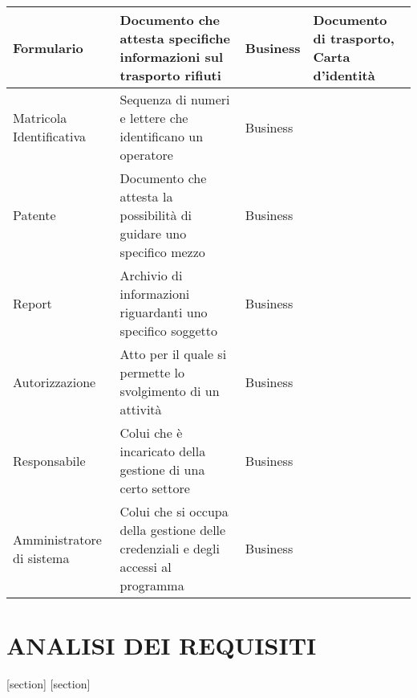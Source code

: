 \documentclass[green, fancy, 11pt]{elegantbook}
\begin{document}
{\begin{tabular}{|p{}|p{6cm}|l|p{4cm}|}
		\hline
		Formulario &Documento che attesta specifiche informazioni sul trasporto rifiuti&Business &Documento di trasporto, Carta d'identità\\
		\hline
		Matricola Identificativa &Sequenza di numeri e lettere che identificano un operatore &Business&\\
		\hline
		Patente &Documento che attesta la possibilità di guidare uno specifico mezzo &Business&\\
		\hline
		Report &Archivio di informazioni riguardanti uno specifico soggetto &Business&\\
		\hline
		Autorizzazione &Atto per il quale si permette lo svolgimento di un attività &Business&\\
		\hline
		Responsabile &Colui che è incaricato della gestione di una certo settore&Business&\\
		\hline
		Amministratore di sistema &Colui che si occupa della gestione delle credenziali e degli accessi al programma &Business&\\
		\hline 
	\end{tabular}
}
\newpage

\chapter{ANALISI DEI REQUISITI}

[section]
[section]
\end{document}
